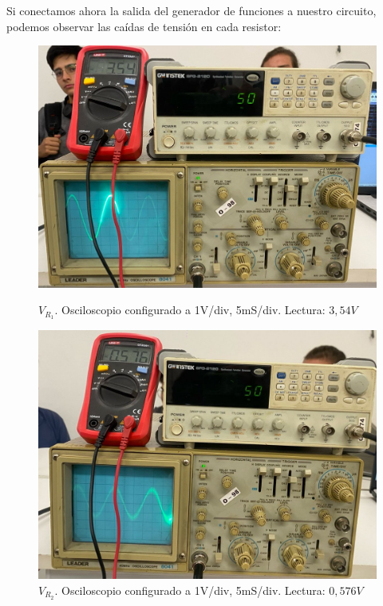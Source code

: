 \documentclass[a4paper,12pt, spanish]{report}
\begin{document}
      Si conectamos ahora la salida del generador de funciones a nuestro circuito, podemos observar las caídas de
      tensión en cada resistor:
      \begin{figure}[!h]
        \centering
        \begin{minipage}{0.45\textwidth}
          \includegraphics[width=1\linewidth]{pictures/osc-mult-ac_v_r1.jpeg}
          \caption{$V_{R_1}$. Osciloscopio configurado a 1V/div, 5mS/div. Lectura: $3,54V$}
        \end{minipage}
        \hspace{0.5cm}
        \begin{minipage}{0.45\textwidth}
          \includegraphics[width=1\linewidth]{pictures/osc-ac-mult-v_r2-r3.jpeg}
          \caption{$V_{R_2}$. Osciloscopio configurado a 1V/div, 5mS/div. Lectura: $0,576V$}
        \end{minipage}
      \end{figure}
\end{document}
